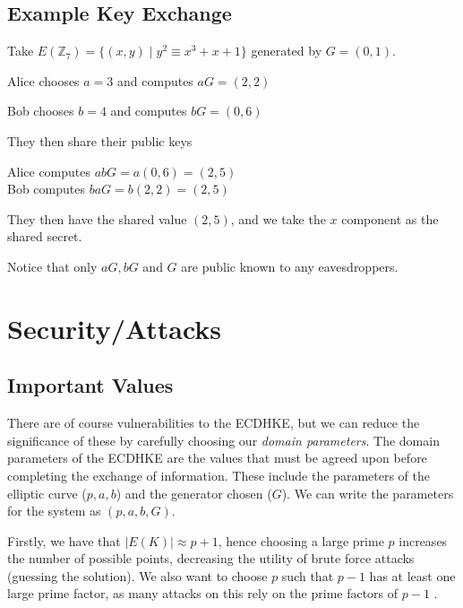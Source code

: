 \documentclass{article}
\theoremstyle{plain}
\theoremstyle{definition}
\newcommand{\abs}[1]{\lvert #1 \rvert}
\begin{document}
        \subsection{Example Key Exchange}\label{example}

            Take $E(\mathbb{Z}_7) = \{(x, y) \mid y^2 \equiv x^3 + x + 1\}$ generated by $G = (0, 1)$.

            Alice chooses $a = 3$ and computes $aG = (2, 2)$
            
            Bob chooses $b = 4$ and computes $bG = (0, 6)$
    
            They then share their public keys
    
            Alice computes $abG = a(0, 6) = (2, 5)$\\
            Bob computes $baG = b(2, 2) = (2, 5)$
    
            They then have the shared value $(2, 5)$, and we take the $x$ component as the shared secret.
    
            Notice that only $aG, bG$ and $G$ are public known to any eavesdroppers. 


\section{Security/Attacks}\label{SA}

        \subsection{Important Values}\label{values}

                There are of course vulnerabilities to the ECDHKE, but we can reduce the significance of these by carefully choosing our \textit{domain parameters}.
                The domain parameters of the ECDHKE are the values that must be agreed upon before completing the exchange of information.
                These include the parameters of the elliptic curve ($p, a, b$) and the generator chosen ($G$).
                We can write the parameters for the system as $(p, a, b, G)$.

                Firstly, we have that $\abs{E(K)} \approx p + 1$, hence choosing a large prime $p$ increases the number of possible points, decreasing the utility of brute force attacks (guessing the solution).
                We also want to choose $p$ such that $p - 1$ has at least one large prime factor, as many attacks on this rely on the prime factors of $p - 1$ \cite{mollin}.
\end{document}

